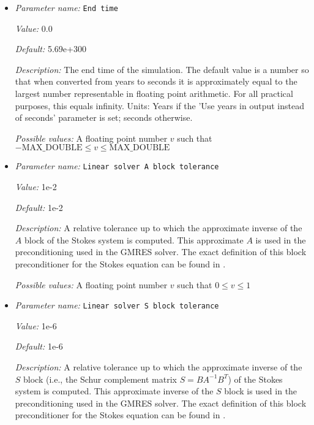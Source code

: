 \begin{itemize}
{\it Description:} The number of space dimensions you want to run this program in. ASPECT can run in 2 and 3 space dimensions.


{\it Possible values:} An integer $n$ such that $2\leq n \leq 4$
\item {\it Parameter name:} {\tt End time}
\label{parameters:End time}


{\it Value:} 0.0


{\it Default:} 5.69e+300


{\it Description:} The end time of the simulation. The default value is a number so that when converted from years to seconds it is approximately equal to the largest number representable in floating point arithmetic. For all practical purposes, this equals infinity. Units: Years if the 'Use years in output instead of seconds' parameter is set; seconds otherwise.


{\it Possible values:} A floating point number $v$ such that $-\text{MAX\_DOUBLE} \leq v \leq \text{MAX\_DOUBLE}$
\item {\it Parameter name:} {\tt Linear solver A block tolerance}
\label{parameters:Linear solver A block tolerance}


{\it Value:} 1e-2


{\it Default:} 1e-2


{\it Description:} A relative tolerance up to which the approximate inverse of the $A$ block of the Stokes system is computed. This approximate $A$ is used in the preconditioning used in the GMRES solver. The exact definition of this block preconditioner for the Stokes equation can be found in \cite{KHB12}.


{\it Possible values:} A floating point number $v$ such that $0 \leq v \leq 1$
\item {\it Parameter name:} {\tt Linear solver S block tolerance}
\label{parameters:Linear solver S block tolerance}


{\it Value:} 1e-6


{\it Default:} 1e-6


{\it Description:} A relative tolerance up to which the approximate inverse of the $S$ block (i.e., the Schur complement matrix $S = BA^{-1}B^{T}$) of the Stokes system is computed. This approximate inverse of the $S$ block is used in the preconditioning used in the GMRES solver. The exact definition of this block preconditioner for the Stokes equation can be found in \cite{KHB12}.



\end{itemize}
